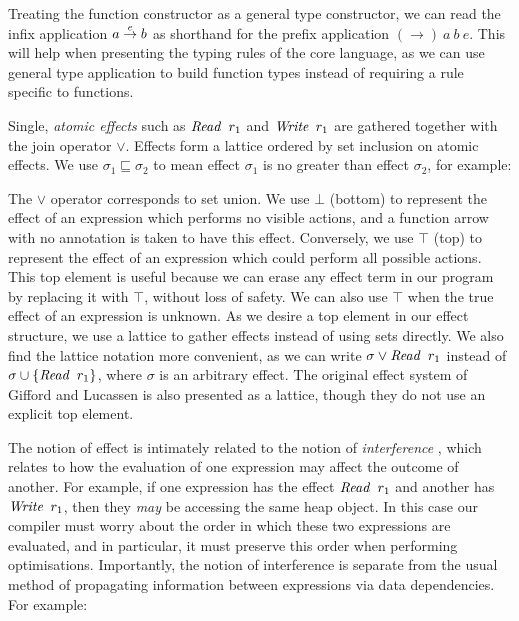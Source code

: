 \code{
	$\iRead$	& $:: \% \to \ !$ \\
	$\iWrite$	& $:: \% \to \ !$
}

Treating the function constructor as a general type constructor, we can read the infix application $a \stackrel{e}{\rightarrow} b$ as shorthand for the prefix application $(\to) \ a \ b \ e$. This will help when presenting the typing rules of the core language, as we can use general type application to build function types instead of requiring a rule specific to functions.

Single, \emph{atomic effects} such as $\operatorname{\mathit{Read}} \ r_1$ and $\operatorname{\mathit{Write}} \ r_1$ are gathered together with the join operator $\lor$. Effects form a lattice ordered by set inclusion on atomic effects. We use $\sigma_1 \sqsubseteq \sigma_2$ to mean effect $\sigma_1$ is no greater than effect $\sigma_2$, for example:


The $\lor$ operator corresponds to set union. We use $\bot$ (bottom) to represent the effect of an expression which performs no visible actions, and a function arrow with no annotation is taken to have this effect. Conversely, we use $\top$ (top) to represent the effect of an expression which could perform all possible actions. This top element is useful because we can erase any effect term in our program by replacing it with $\top$, without loss of safety. We can also use $\top$ when the true effect of an expression is unknown. As we desire a top element in our effect structure, we use a lattice to gather effects instead of using sets directly. We also find the lattice notation more convenient, as we can write $\sigma \lor \operatorname{\mathit{Read}} \ r_1$ instead of $\sigma \cup \{ \operatorname{\mathit{Read}} \ r_1 \}$, where $\sigma$ is an arbitrary effect. The original effect system of Gifford and Lucassen \cite{gifford:integrating} is also presented as a lattice, though they do not use an explicit top element.

The notion of effect is intimately related to the notion of \emph{interference} \cite{reynolds:interference}, which relates to how the evaluation of one expression may affect the outcome of another. For example, if one expression has the effect $\operatorname{\mathit{Read}} \ r_1$ and another has $\operatorname{\mathit{Write}} \ r_1$, then they \emph{may} be accessing the same heap object. In this case our compiler must worry about the order in which these two expressions are evaluated, and in particular, it must preserve this order when performing optimisations. Importantly, the notion of interference is separate from the usual method of propagating information between expressions via data dependencies. For example:

